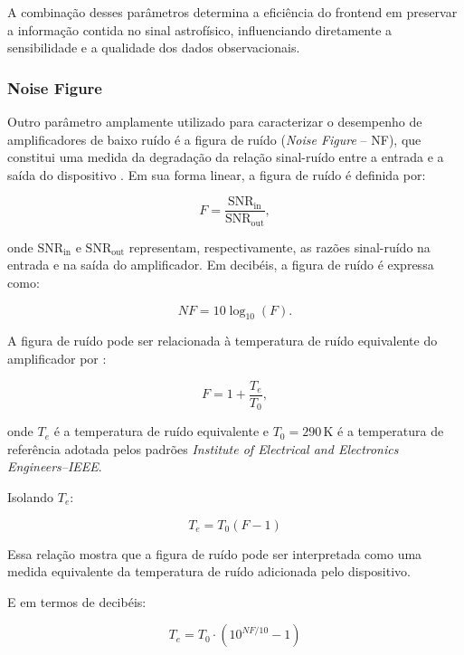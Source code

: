 A combinação desses parâmetros determina a eficiência do frontend em preservar a informação contida no sinal astrofísico, influenciando diretamente a sensibilidade e a qualidade dos dados observacionais.

\subsubsection{Noise Figure}

Outro parâmetro amplamente utilizado para caracterizar o desempenho de amplificadores de baixo ruído é a figura de ruído (\textit{Noise Figure} -- NF), que constitui uma medida da degradação da relação sinal-ruído entre a entrada e a saída do dispositivo \cite{pozar2012microwave}. Em sua forma linear, a figura de ruído é definida por:

\begin{equation}
F = \frac{\mathrm{SNR}_{\mathrm{in}}}{\mathrm{SNR}_{\mathrm{out}}},
\end{equation}

onde $\mathrm{SNR}_{\mathrm{in}}$ e $\mathrm{SNR}_{\mathrm{out}}$ representam, respectivamente, as razões sinal-ruído na entrada e na saída do amplificador. Em decibéis, a figura de ruído é expressa como:

\begin{equation}
NF = 10\log_{10}(F).
\end{equation}

A figura de ruído pode ser relacionada à temperatura de ruído equivalente do amplificador por \cite{pozar2012microwave}:

\begin{equation}
F = 1 + \frac{T_e}{T_0},
\end{equation}

onde $T_e$ é a temperatura de ruído equivalente e $T_0 = 290\,\mathrm{K}$ é a temperatura de referência adotada pelos padrões \textit{Institute of Electrical and Electronics Engineers--IEEE}.

Isolando \( T_e \):

\begin{equation}
T_e = T_0(F-1)
\end{equation}

Essa relação mostra que a figura de ruído pode ser interpretada como uma medida equivalente da temperatura de ruído adicionada pelo dispositivo.

E em termos de decibéis:

\begin{equation}
  T_e = T_0 \cdot \left(10^{NF/10} - 1\right)  
\end{equation}


